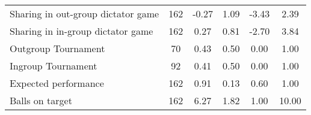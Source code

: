 {\begin{tabular}{l*{1}{ccccc}}
Sharing in out-group dictator game &         162&       -0.27&        1.09&       -3.43&        2.39\\
Sharing in in-group dictator game   &         162&        0.27&        0.81&       -2.70&        3.84\\
Outgroup Tournament &          70&        0.43&        0.50&        0.00&        1.00\\
Ingroup Tournament  &          92&        0.41&        0.50&        0.00&        1.00\\
Expected performance&         162&        0.91&        0.13&        0.60&        1.00\\
Balls on target     &         162&        6.27&        1.82&        1.00&       10.00\\
\hline\hline
\end{tabular}
}
